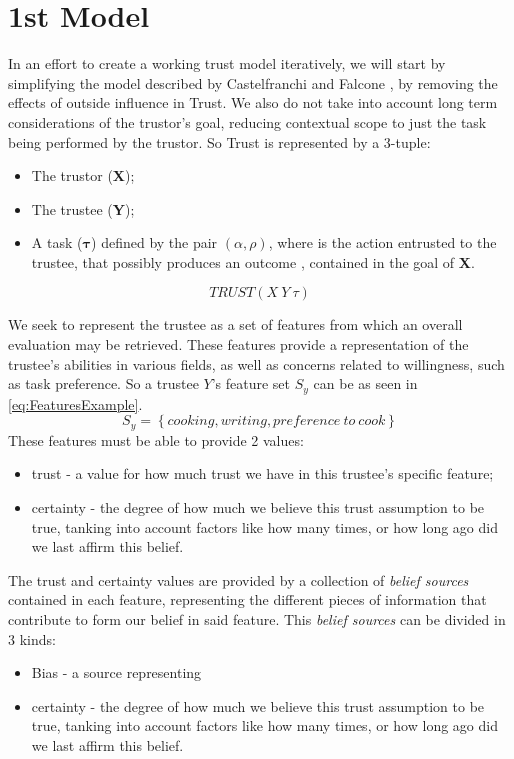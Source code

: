 \section{1st Model}
\label{sec:Model}

In an effort to create a working trust model iteratively, we will start by simplifying the model described by Castelfranchi and Falcone \cite{Castelfranchi1998}, by removing the effects of outside influence in Trust. We also do not take into account long term considerations of the trustor's goal, reducing contextual scope to just the task being performed by the trustor. So Trust is represented by a 3-tuple:

\begin{itemize}
	\item The trustor (\textbf{X});
	\item The trustee (\textbf{Y});
	\item A task ($\bm{\tau}$) defined by the pair $(\alpha, \rho)$, where \bm{$\alpha$} is the action entrusted to the trustee, that possibly produces an outcome \bm{$\rho$}, contained in the goal of \textbf{X}.
\end{itemize}
\begin{equation}
TRUST(X\ Y\ \tau)
\label{eq:TrustRelation}
\end{equation}

We seek to represent the trustee as a set of features from which an overall evaluation may be retrieved. These features provide a representation of the trustee's abilities in various fields, as well as concerns related to willingness, such as task preference. So a trustee $Y$'s feature set $ S_y $ can be as seen in \ref{eq:FeaturesExample}.
\begin{equation}
S_y=\left\{cooking, writing, preference\ to\ cook\right\}
\label{eq:FeaturesExample}
\end{equation}
These features must be able to provide 2 values:

\begin{itemize}
	\item trust - a value for how much trust we have in this trustee's specific feature;
	\item certainty - the degree of how much we believe this trust assumption to be true, tanking into account factors like how many times, or how long ago did we last affirm this belief.
\end{itemize}

The trust and certainty values are provided by a collection of \textit{belief sources} contained in each feature, representing the different pieces of information that contribute to form our belief in said feature. This \textit{belief sources} can be divided in 3 kinds: 
\begin{itemize}
	\item Bias - a source representing 
	\item certainty - the degree of how much we believe this trust assumption to be true, tanking into account factors like how many times, or how long ago did we last affirm this belief.
\end{itemize}

